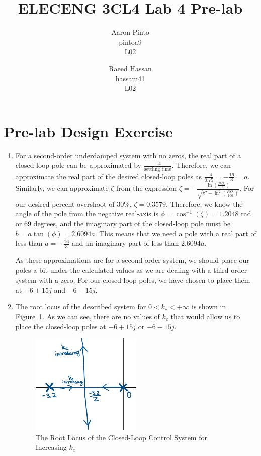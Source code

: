 \documentclass[12pt]{article}
\title{ELECENG 3CL4 Lab 4 Pre-lab}
\author{
    Aaron Pinto \\
    pintoa9 \\
    L02
    \and
    Raeed Hassan \\
    hassam41 \\
    L02
}
\begin{document}
\maketitle
\clearpage

\section{Pre-lab Design Exercise}
\begin{enumerate}
	\item %
    For a second-order underdamped system with no zeros, the real part of a closed-loop pole can be approximated by $\frac{-4}{\text{settling time}}$. Therefore, we can approximate the real part of the desired closed-loop poles as $\frac{-4}{0.75} = -\frac{16}{3} = a$. Similarly, we can approximate $\zeta$ from the expression $\zeta = -\frac{\ln\left(\frac{P.O.}{100}\right)}{\sqrt{\pi^2 + \ln^2\left(\frac{P.O.}{100}\right)}}$. For our desired percent overshoot of 30\%, $\zeta = 0.3579$. Therefore, we know the angle of the pole from the negative real-axis is $\phi = \cos^{-1}(\zeta) = 1.2048$ rad or 69 degrees, and the imaginary part of the closed-loop pole must be $b = a\tan(\phi) = 2.6094a$. This means that we need a pole with a real part of less than $a = -\frac{16}{3}$ and an imaginary part of less than $2.6094a$.

    As these approximations are for a second-order system, we should place our poles a bit under the calculated values as we are dealing with a third-order system with a zero. For our closed-loop poles, we have chosen to place them at $-6 + 15j$ and $-6 - 15j$.

    \item %
    The root locus of the described system for $0 < k_c < +\infty$ is shown in Figure~\ref{fig:q2_root_locus}. As we can see, there are no values of $k_c$ that would allow us to place the closed-loop poles at $-6 + 15j$ or $-6 - 15j$.
    \begin{figure}[h]
        \centering
        \includegraphics[width=0.5\textwidth]{q2}
        \caption{\label{fig:q2_root_locus}The Root Locus of the Closed-Loop Control System for Increasing $k_c$}
    \end{figure}


\end{enumerate}
\end{document}

